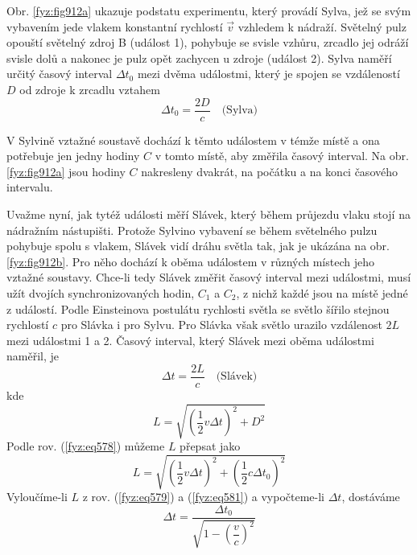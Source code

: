     Obr. \ref{fyz:fig912a} ukazuje podstatu experimentu, který provádí Sylva, jež se svým vybavením
    jede vlakem konstantní rychlostí \(\vec{v}\) vzhledem k nádraží. Světelný pulz opouští světelný
    zdroj B (událost 1), pohybuje se svisle vzhůru, zrcadlo jej odráží svisle dolů a nakonec je pulz
    opět zachycen u zdroje (událost 2). Sylva naměří určitý časový interval \(\Delta t_0\) mezi
    dvěma událostmi, který je spojen se vzdáleností \(D\) od zdroje k zrcadlu vztahem
    \begin{equation}\label{fyz:eq578}
      \Delta t_0 = \frac{2D}{c} \quad \text{(Sylva)}
    \end{equation}

    V Sylvině vztažné soustavě dochází k těmto událostem v témže místě a ona potřebuje jen jedny
    hodiny \(C\) v tomto místě, aby změřila časový interval. Na obr.\ref{fyz:fig912a} jsou hodiny
    \(C\) nakresleny dvakrát, na počátku a na konci časového intervalu.

    Uvažme nyní, jak tytéž události měří Slávek, který během průjezdu vlaku stojí na nádražním
    nástupišti. Protože Sylvino vybavení se během světelného pulzu pohybuje spolu s vlakem, Slávek
    vidí dráhu světla tak, jak je ukázána na obr. \ref{fyz:fig912b}. Pro něho dochází k oběma
    událostem v různých místech jeho vztažné soustavy. Chce-li tedy Slávek změřit časový interval
    mezi událostmi, musí užít dvojích synchronizovaných hodin, \(C_1\) a \(C_2\), z nichž každé jsou
    na místě jedné z událostí. Podle Einsteinova postulátu rychlosti světla se světlo šířilo stejnou
    rychlostí \(c\) pro Slávka i pro Sylvu. Pro Slávka však světlo urazilo vzdálenost \(2L\) mezi
    událostmi 1 a 2. Časový interval, který Slávek mezi oběma událostmi naměřil, je
    \begin{equation}\label{fyz:eq579}
      \Delta t = \frac{2L}{c} \quad \text{(Slávek)}
    \end{equation}
    kde
    \begin{equation}\label{fyz:eq580}
      L = \sqrt{(\frac{1}{2}v\Delta t)^2 + D^2}
    \end{equation}
    Podle rov. (\ref{fyz:eq578}) můžeme \(L\) přepsat jako
    \begin{equation}\label{fyz:eq581}
      L = \sqrt{(\frac{1}{2}v\Delta t)^2 + (\frac{1}{2}c\Delta t_0)^2}
    \end{equation}
    Vyloučíme-li \(L\) z rov. (\ref{fyz:eq579}) a (\ref{fyz:eq581}) a vypočteme-li \(\Delta t\),
    dostáváme
    \begin{equation}\label{fyz:eq582}
      \boxed{\Delta t = \dfrac{\Delta t_0}{\sqrt{1  - \left(\dfrac{v}{c}\right)^2}}}
    \end{equation}

